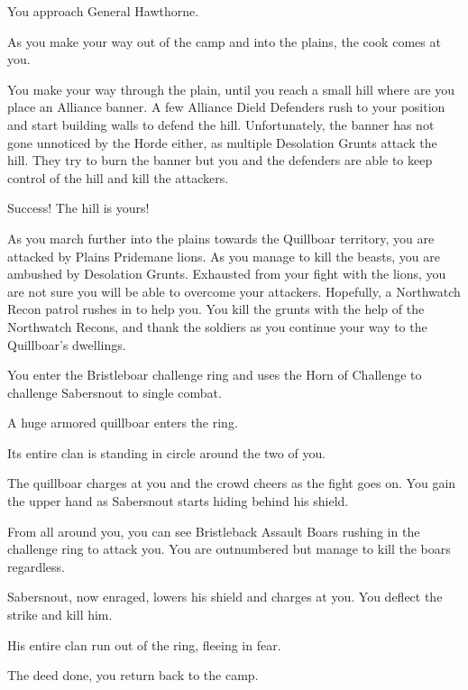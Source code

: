 You approach General Hawthorne.




As you make your way out of the camp and into the plains, the cook comes at you.


You make your way through the plain, until you reach a small hill where are you place an Alliance banner. A few Alliance Dield Defenders rush to your position and start building walls to defend the hill.  Unfortunately, the banner has not gone unnoticed by the Horde either, as multiple Desolation Grunts attack the hill. They try to burn the banner but you and the defenders are able to keep control of the hill and kill the attackers.

Success! The hill is yours!

As you march further into the plains towards the Quillboar territory,  you are attacked by Plains Pridemane lions. As you manage to kill the beasts, you are ambushed by Desolation Grunts. Exhausted from your fight with the lions,  you are not sure you will be able to overcome your attackers. Hopefully, a Northwatch Recon patrol rushes in to help you. You kill the grunts with the help of the Northwatch Recons, and thank the soldiers as you continue your way to the Quillboar's dwellings.

You enter the Bristleboar challenge ring and uses the Horn of Challenge to challenge Sabersnout to single combat.

A huge armored quillboar enters the ring.


Its entire clan is standing in circle around the two of you.


The quillboar charges at you and the crowd cheers as the fight goes on. You gain the upper hand as Sabersnout starts hiding behind his shield.


From all around you, you can see Bristleback Assault Boars rushing in the challenge ring to attack you.  You are outnumbered but manage to kill the boars regardless.


Sabersnout, now enraged, lowers his shield and charges at you. You deflect the strike and kill him.


His entire clan run out of the ring, fleeing in fear.

The deed done, you return back to the camp.

